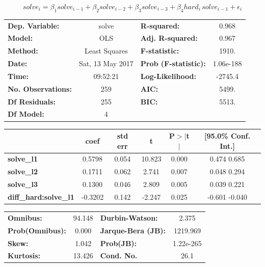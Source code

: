 \documentclass{article}
\begin{document}
\[
solve_i = \beta_1 solve_{i-1} + \beta_2 solve_{i-2} + \beta_3 solve_{i-3} + \beta_4 hard_i \, solve_{i-1} + \epsilon_i
\]

\begin{center}
\begin{tabular}{lclc}
\toprule
\textbf{Dep. Variable:}     &      solve       & \textbf{  R-squared:         } &     0.968   \\
\textbf{Model:}             &       OLS        & \textbf{  Adj. R-squared:    } &     0.967   \\
\textbf{Method:}            &  Least Squares   & \textbf{  F-statistic:       } &     1910.   \\
\textbf{Date:}              & Sat, 13 May 2017 & \textbf{  Prob (F-statistic):} & 1.06e-188   \\
\textbf{Time:}              &     09:52:21     & \textbf{  Log-Likelihood:    } &   -2745.4   \\
\textbf{No. Observations:}  &         259      & \textbf{  AIC:               } &     5499.   \\
\textbf{Df Residuals:}      &         255      & \textbf{  BIC:               } &     5513.   \\
\textbf{Df Model:}          &           4      & \textbf{                     } &             \\
\bottomrule
\end{tabular}
\begin{tabular}{lccccc}
                            & \textbf{coef} & \textbf{std err} & \textbf{t} & \textbf{P$>$$|$t$|$} & \textbf{[95.0\% Conf. Int.]}  \\
\midrule
\textbf{solve\_l1}           &       0.5798  &        0.054     &    10.823  &         0.000        &         0.474     0.685       \\
\textbf{solve\_l2}           &       0.1711  &        0.062     &     2.741  &         0.007        &         0.048     0.294       \\
\textbf{solve\_l3}           &       0.1300  &        0.046     &     2.809  &         0.005        &         0.039     0.221       \\
\textbf{diff\_hard:solve\_l1} &      -0.3202  &        0.142     &    -2.247  &         0.025        &        -0.601    -0.040       \\
\bottomrule
\end{tabular}
\begin{tabular}{lclc}
\textbf{Omnibus:}       & 94.148 & \textbf{  Durbin-Watson:     } &     2.375  \\
\textbf{Prob(Omnibus):} &  0.000 & \textbf{  Jarque-Bera (JB):  } &  1219.969  \\
\textbf{Skew:}          &  1.042 & \textbf{  Prob(JB):          } & 1.22e-265  \\
\textbf{Kurtosis:}      & 13.426 & \textbf{  Cond. No.          } &      26.1  \\
\bottomrule
\end{tabular}
\end{center}
\end{document}
